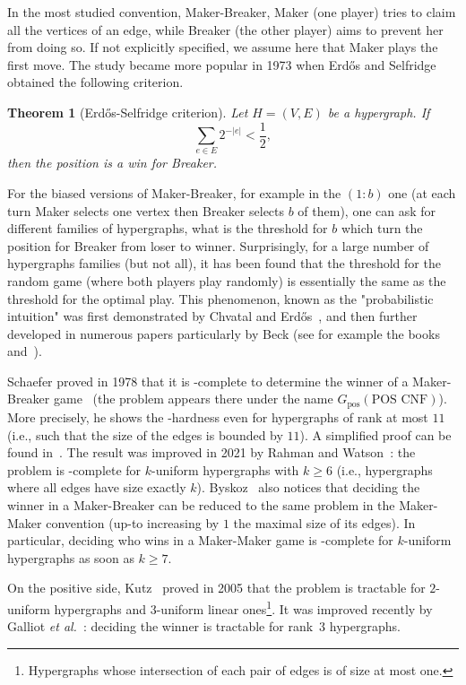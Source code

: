\documentclass{article}
\newcommand{\etal}{{\em et al.}\xspace}
\newcommand{\hedge}{edge\xspace}
\newcommand{\hedges}{edges\xspace}
\newtheorem{theorem}{Theorem}
\begin{document}
In the most studied convention, Maker-Breaker, Maker (one player) tries to claim all the vertices of an \hedge, while Breaker (the other player) aims to prevent her from doing so. If not explicitly specified, we assume here that Maker plays the first move. The study became more popular in 1973 when Erd\H os and Selfridge~\cite{ES73} obtained the following criterion.
\begin{theorem}[Erd\H os-Selfridge criterion]
\label{thm:ErdosSelfridge}
Let \(H = (V,E)\) be a hypergraph. If
\[
    \sum_{e \in E} 2^{-\lvert e\rvert} < \frac{1}{2},
\]
then the position is a win for Breaker. 
\end{theorem}

For the biased versions of Maker-Breaker, for example in the \((1 : b)\) one (at each turn Maker selects one vertex then Breaker selects \(b\) of them), one can ask for different families of hypergraphs, what is the threshold for \(b\) which turn the position for Breaker from loser to winner. Surprisingly, for a large number of hypergraphs families (but not all), it has been found that the threshold for the random game (where both players play randomly) is essentially the same as the threshold for the optimal play. This phenomenon, known as the "probabilistic intuition" was first demonstrated by Chvatal and Erd\H os~\cite{CE78}, and then further developed in numerous papers particularly by Beck (see for example the books~\cite{Bec02} and~\cite{HKST14}).





Schaefer proved in 1978 that it is \PSPACE-complete to determine the winner of a Maker-Breaker game~\cite{Sch78} (the problem appears there under the name \(G_{\text{pos}}(\text{POS CNF})\)). More precisely, he shows the \PSPACE-hardness even for hypergraphs of rank at most \(11\) (i.e., such that the size of the \hedges is bounded by \(11\)). A simplified proof can be found in~\cite{Bys04}. The result was improved in 2021 by Rahman and Watson~\cite{RW21}: the problem is \PSPACE-complete for $k$-uniform hypergraphs with \(k \ge 6\) (i.e., hypergraphs where all \hedges have size exactly \(k\)). 
Byskoz~\cite{Bys04} also notices that deciding the winner in a Maker-Breaker can be reduced to the same problem in the Maker-Maker convention (up-to increasing by \(1\) the maximal size of its edges). In particular, deciding who wins in a Maker-Maker game is \PSPACE-complete for \(k\)-uniform hypergraphs as soon as \(k \ge 7\).
 
On the positive side, Kutz~\cite{Kut05} proved in 2005 that the problem is tractable for $2$-uniform hypergraphs and $3$-uniform linear ones\footnote{Hypergraphs whose intersection of each pair of \hedges is of size at most one.}. It was improved recently by Galliot \etal~\cite{Gal23thesis, GGS22}: deciding the winner is tractable for rank~$3$ hypergraphs.
\end{document}
